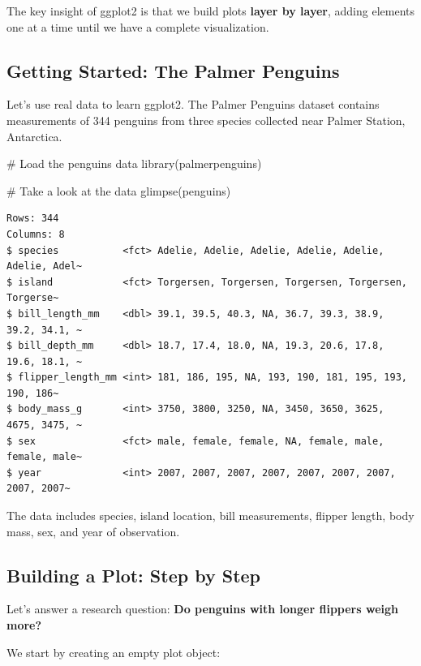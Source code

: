 \documentclass[
  letterpaper,
  DIV=11,
  numbers=noendperiod]{scrreprt}
\newenvironment{Shaded}{\begin{snugshade}}{\end{snugshade}}
\newcommand{\CommentTok}[1]{\textcolor[rgb]{0.37,0.37,0.37}{#1}}
\newcommand{\FunctionTok}[1]{\textcolor[rgb]{0.28,0.35,0.67}{#1}}
\newcommand{\NormalTok}[1]{\textcolor[rgb]{0.00,0.23,0.31}{#1}}
\begin{document}
The key insight of ggplot2 is that we build plots \textbf{layer by
layer}, adding elements one at a time until we have a complete
visualization.

\subsection{Getting Started: The Palmer
Penguins}\label{getting-started-the-palmer-penguins}

Let's use real data to learn ggplot2. The Palmer Penguins dataset
contains measurements of 344 penguins from three species collected near
Palmer Station, Antarctica.

\begin{Shaded}
\begin{Highlighting}[]
\CommentTok{\# Load the penguins data}
\FunctionTok{library}\NormalTok{(palmerpenguins)}

\CommentTok{\# Take a look at the data}
\FunctionTok{glimpse}\NormalTok{(penguins)}
\end{Highlighting}
\end{Shaded}

\begin{verbatim}
Rows: 344
Columns: 8
$ species           <fct> Adelie, Adelie, Adelie, Adelie, Adelie, Adelie, Adel~
$ island            <fct> Torgersen, Torgersen, Torgersen, Torgersen, Torgerse~
$ bill_length_mm    <dbl> 39.1, 39.5, 40.3, NA, 36.7, 39.3, 38.9, 39.2, 34.1, ~
$ bill_depth_mm     <dbl> 18.7, 17.4, 18.0, NA, 19.3, 20.6, 17.8, 19.6, 18.1, ~
$ flipper_length_mm <int> 181, 186, 195, NA, 193, 190, 181, 195, 193, 190, 186~
$ body_mass_g       <int> 3750, 3800, 3250, NA, 3450, 3650, 3625, 4675, 3475, ~
$ sex               <fct> male, female, female, NA, female, male, female, male~
$ year              <int> 2007, 2007, 2007, 2007, 2007, 2007, 2007, 2007, 2007~
\end{verbatim}

The data includes species, island location, bill measurements, flipper
length, body mass, sex, and year of observation.

\subsection{Building a Plot: Step by
Step}\label{building-a-plot-step-by-step}

Let's answer a research question: \textbf{Do penguins with longer
flippers weigh more?}

We start by creating an empty plot object:
\end{document}
